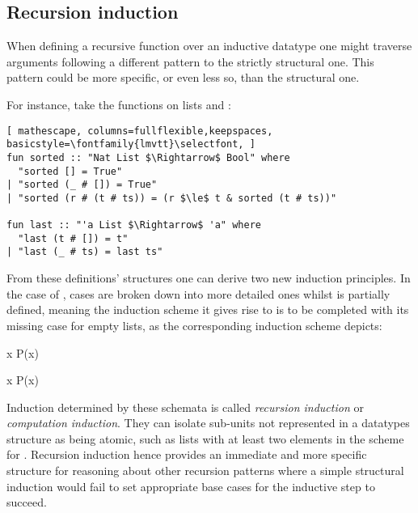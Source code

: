 \label{sec:rec-ind}

\subsection{Recursion induction}

When defining a recursive function over an inductive datatype one might traverse arguments following a different pattern to the strictly structural one.
%
This pattern could be more specific, or even less so, than the structural one.

For instance, take the functions on lists  and :

\begin{lstlisting}[ mathescape, columns=fullflexible,keepspaces, basicstyle=\fontfamily{lmvtt}\selectfont, ]
fun sorted :: "Nat List $\Rightarrow$ Bool" where
  "sorted [] = True"
| "sorted (_ # []) = True"
| "sorted (r # (t # ts)) = (r $\le$ t & sorted (t # ts))"

fun last :: "'a List $\Rightarrow$ 'a" where
  "last (t # []) = t"
| "last (_ # ts) = last ts"
\end{lstlisting}

\noindent From these definitions' structures one can derive two new induction principles.
%
In the case of , cases are broken down into more detailed ones whilst  is partially defined, meaning the induction scheme it gives rise to is to be completed with its missing case for empty lists, as the corresponding induction scheme depicts:

  {\forall x \;\; P\;(x)}

  {\forall x \;\; P\;(x)}

Induction determined by these schemata is called \emph{recursion induction} or \emph{computation induction}.
%
They can isolate sub-units not represented in a datatypes structure as being atomic, such as lists with at least two elements in the scheme for .
%
Recursion induction hence provides an immediate and more specific structure for reasoning about other recursion patterns where a simple structural induction would fail to set appropriate base cases for the inductive step to succeed.

